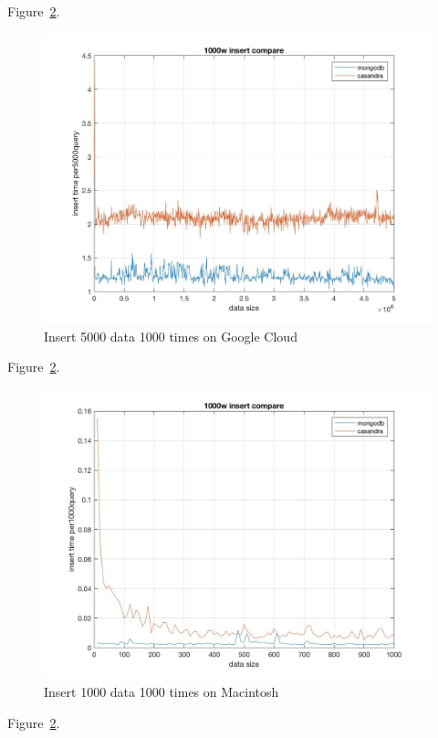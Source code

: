 Figure~\ref{f:fly}.

\begin{figure}[!ht]
  \centering\includegraphics[width=\columnwidth]{images/insert_comp_5000_google.jpg}
  \caption{Insert 5000 data 1000 times on Google Cloud}\label{f:fly}
\end{figure}

Figure~\ref{f:fly}.

\begin{figure}[!ht]
  \centering\includegraphics[width=\columnwidth]{images/insert_comp_1000.jpg}
  \caption{Insert 1000 data 1000 times on Macintosh }\label{f:fly}
\end{figure}

Figure~\ref{f:fly}.

